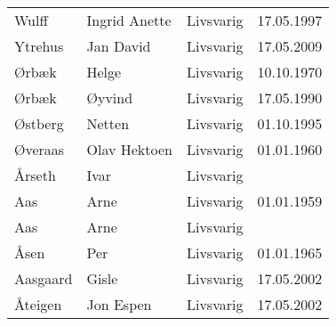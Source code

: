 \begin{longtable}{llll}
        Wulff 	&	Ingrid Anette	&	Livsvarig	&	17.05.1997	\\
        Ytrehus	&	Jan David	&	Livsvarig	&	17.05.2009	\\
        Ørbæk	&	Helge	&	Livsvarig 	&	10.10.1970	\\
        Ørbæk	&	Øyvind	&	Livsvarig 	&	17.05.1990	\\
        Østberg 	&	Netten	&	Livsvarig	&	01.10.1995	\\
        Øveraas	&	Olav Hektoen	&	Livsvarig 	&	01.01.1960	\\
        Årseth	&	Ivar	&	Livsvarig 	&		\\
        Aas	&	Arne	&	Livsvarig 	&	01.01.1959	\\
        Aas	&	Arne	&	Livsvarig 	&		\\
        Åsen	&	Per	&	Livsvarig 	&	01.01.1965	\\
        Aasgaard 	&	Gisle	&	Livsvarig	&	17.05.2002	\\
        Åteigen 	&	Jon Espen	&	Livsvarig	&	17.05.2002
    \end{longtable}

